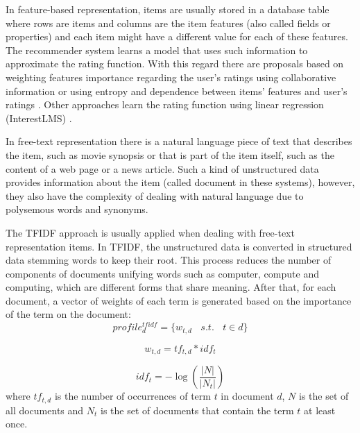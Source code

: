 \documentclass[preprint]{elsarticle}
\begin{document}
\begin{spacing}{1.5}
In feature-based representation, items are usually stored in a database table where rows are items and columns are the item features (also called fields or properties) and each item might have a different value for each of these features. The recommender system learns a model that uses such information to approximate the rating function. With this regard there are proposals based on weighting features importance regarding the user's ratings using collaborative information \cite{Symeonidis2007} or using entropy and dependence between items' features and user's ratings \cite{Castro2014}. Other approaches learn the rating function using linear regression (InterestLMS) \cite{DePessemier2016}.

In free-text representation there is a natural language piece of text that describes the item, such as movie synopsis or that is part of the item itself, such as the content of a web page or a news article. Such a kind of unstructured data provides information about the item (called document in these systems), however, they also have the complexity of dealing with natural language due to polysemous words and synonyms. 

The TFIDF approach is usually applied when dealing with free-text representation items. In TFIDF, the unstructured data is converted in structured data stemming words \cite{Porter1980} to keep their root. This process reduces the number of components of documents unifying words such as computer, compute and computing, which are different forms that share meaning. After that, for each document, a vector of weights of each term is generated based on the importance of the term on the document:
\begin{equation}
	profile^{tfidf}_{d} = \{w_{t,d}~~~~s.t.~~~~ t \in d \}
	\label{eq:document-profile-tfidf}
\end{equation}

\begin{equation}
	w_{t,d} = tf_{t,d}*idf_{t}
	\label{eq:document-profile-tfidf-term-weights}
\end{equation}

\begin{equation}
	idf_t = -\log \left( \frac{|N|}{|N_t|}\right)
	\label{eq:document-profile-tfidf-idf}
\end{equation}
\noindent where $tf_{t,d}$ is the number of occurrences of term $t$ in document $d$, $N$ is the set of all documents and $N_t$ is the set of documents that contain the term $t$ at least once.


\end{spacing}
\end{document}
